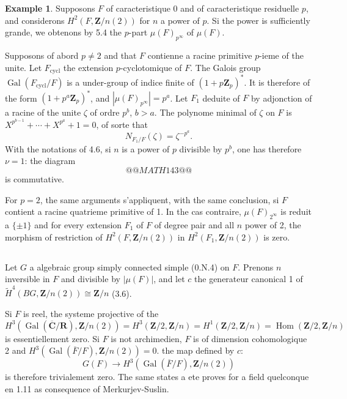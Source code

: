\documentclass[11pt,a4paper]{article}
\theoremstyle{plain}
\theoremstyle{definition}
\newtheorem{example}[theorem]{Example}
\DeclareMathOperator{\Gal}{Gal}
\DeclareMathOperator{\Hom}{Hom}
\begin{document}
\begin{example}\label{5.8}
Supposons $F$ of caracteristique 0 and of caracteristique residuelle $p$, and considerons $H^2(F, \mathbf{Z}/n(2))$ for $n$ a power of $p$. Si the power is sufficiently grande, we obtenons by 5.4 the $p$-part $\mu(F)_{p^\infty}$ of $\mu(F)$.

Supposons of abord $p \neq 2$ and that $F$ contienne a racine primitive $p$-ieme of the unite. Let $F_{\text{cycl}}$ the extension $p$-cyclotomique of $F$. The Galois group $\Gal(F_{\text{cycl}}/F)$ is a under-group of indice finite of $(1 + p\mathbf{Z}_p)^*$. It is therefore of the form $(1 + p^a \mathbf{Z}_p)^*$, and $|\mu(F)_{p^\infty}| = p^a$. Let $F_1$ deduite of $F$ by adjonction of a racine of the unite $\zeta$ of ordre $p^b$, $b > a$. The polynome minimal of $\zeta$ on $F$ is $X^{p^{b-1}} + \cdots + X^{p^a} + 1 = 0$, of sorte that
\[
N_{F_1/F}(\zeta) = \zeta^{-p^a}.
\]
With the notations of 4.6, si $n$ is a power of $p$ divisible by $p^b$, one has therefore $\nu = 1$: the diagram
\[
@@MATH143@@
\]
is commutative.

For $p = 2$, the same arguments s'appliquent, with the same conclusion, si $F$ contient a racine quatrieme primitive of 1. In the cas contraire, $\mu(F)_{2^\infty}$ is reduit a $\{\pm 1\}$ and for every extension $F_1$ of $F$ of degree pair and all $n$ power of 2, the morphism of restriction of $H^2(F, \mathbf{Z}/n(2))$ in $H^2(F_1, \mathbf{Z}/n(2))$ is zero.
\end{example}

\subsection{}\label{5.9}

Let $G$ a algebraic group simply connected simple (0.N.4) on $F$. Prenons $n$ inversible in $F$ and divisible by $|\mu(F)|$, and let $c$ the generateur canonical 1 of $\widetilde{H}^4(BG, \mathbf{Z}/n(2)) \cong \mathbf{Z}/n$ (3.6).

Si $F$ is reel, the systeme projective of the
\[
H^3(\Gal(\overline{\mathbf{C}}/\mathbf{R}), \mathbf{Z}/n(2)) = H^3(\mathbf{Z}/2, \mathbf{Z}/n) = H^1(\mathbf{Z}/2, \mathbf{Z}/n) = \Hom(\mathbf{Z}/2, \mathbf{Z}/n)
\]
is essentiellement zero. Si $F$ is not archimedien, $F$ is of dimension cohomologique 2 and $H^3(\Gal(\overline{F}/F), \mathbf{Z}/n(2)) = 0$. the map defined by $c$:
\[
G(F) \to H^3(\Gal(\overline{F}/F), \mathbf{Z}/n(2))
\]
is therefore trivialement zero. The same states a ete proves for a field quelconque en 1.11 as consequence of Merkurjev-Suslin.
\end{document}
